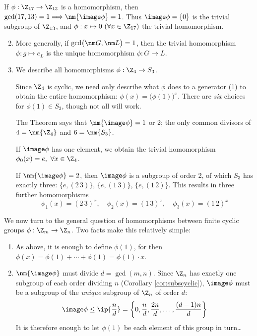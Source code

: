\goodbreak


\begin{examples}{}{}
	\exstart If $\phi:\Z_{17}\to\Z_{13}$ is a homomorphism, then $\gcd(17,13)=1\Longrightarrow\nm{\image\phi}=1$. Thus $\image\phi=\{0\}$ is the trivial subgroup of $\Z_{13}$, and $\phi:x\mapsto 0\ (\forall x\in\Z_{17})$ the trivial homomorphism.\vspace{-5pt}
	\begin{enumerate}\setcounter{enumi}{1}
	  \item[] More generally, if $\gcd\bigl(\nm G,\nm L\bigr)=1$, then the trivial homomorphism $\phi:g\mapsto e_L$ is the unique homomorphism $\phi:G\to L$.

	  \item We describe all homomorphisms $\phi:\Z_4\to S_3$.\par
	  Since $\Z_4$ is cyclic, we need only describe what $\phi$ does to a generator (1) to obtain the entire homomorphism: $\phi(x)=\bigl(\phi(1)\bigr)^x$. There are \emph{six} choices for $\phi(1)\in S_3$, though not all will work.\par
	  The Theorem says that $\nm{\image\phi}=1$ or 2; the only common divisors of $4=\nm{\Z_4}$ and $6=\nm{S_3}$.\par
	  If $\image\phi$ has one element, we obtain the trivial homomorphism $\phi_0(x)=e,\ \forall x\in\Z_4$.\par
	  If $\nm{\image\phi}=2$, then $\image\phi$ is a subgroup of order 2, of which $S_3$ has exactly three: $\{e,(2\,3)\}$, $\{e,(1\,3)\}$, $\{e,(1\,2)\}$. This results in three further homomorphisms
	  \[
	  	\phi_1(x)=(2\,3)^x,\quad 
	  	\phi_2(x)=(1\,3)^x,\quad
	  	\phi_3(x)=(1\,2)^x
	  \]
	\end{enumerate}
\end{examples}

We now turn to the general question of homomorphisms between finite cyclic groups $\phi:\Z_m\to\Z_n$. Two facts make this relatively simple:
\begin{enumerate}
  \item As above, it is enough to define $\phi(1)$, for then $\phi(x)=\phi(1)+\cdots+\phi(1)=\phi(1)\cdot x$.
  \item $\nm{\image\phi}$ must divide $d=\gcd(m,n)$. Since $\Z_n$ has exactly one subgroup of each order dividing $n$ (Corollary \ref{cor:subscyclic}), $\image\phi$ must be a subgroup of the \emph{unique} subgroup of $\Z_n$ of order $d$:
	\[
		\image\phi\le\ip{\frac nd}
		=\left\{0,\frac nd,\frac{2n}d,\ldots,\frac{(d-1)n}d\right\}
	\]
	It is therefore enough to let $\phi(1)$ be each element of this group in turn\ldots
\end{enumerate} 

